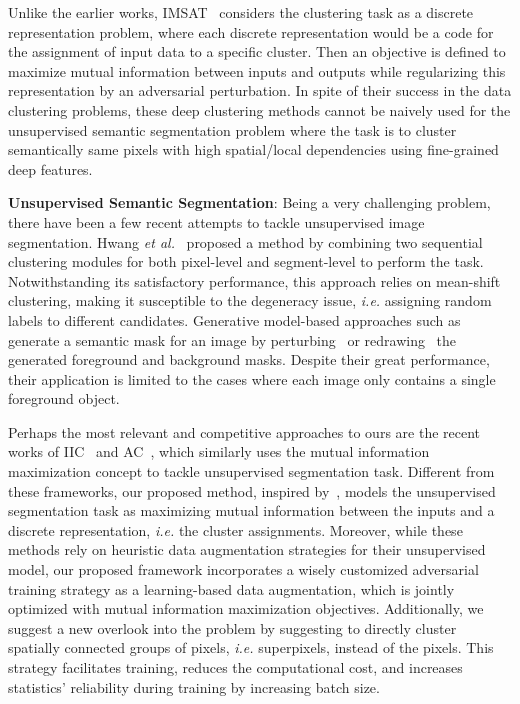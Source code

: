 \documentclass[letterpaper, 10 pt, journal, twoside]{IEEEtran}
\newcommand{\ie}{\emph{i.e.}\xspace}
\newcommand{\etal}{\emph{et al.}\xspace}
\begin{document}
Unlike the earlier works, IMSAT~\cite{IMSAT} considers the clustering task as a discrete representation problem, where each discrete representation would be a code for the assignment of input data to a specific cluster. Then an objective is defined to maximize mutual information between inputs and outputs while regularizing this representation by an adversarial perturbation. In spite of their success in the data clustering problems, these deep clustering methods cannot be naively used for the unsupervised semantic segmentation problem where the task is to cluster semantically same pixels with high spatial/local dependencies using fine-grained deep features.\par

\textbf{Unsupervised Semantic Segmentation}:
Being a very challenging problem, there have been a few recent attempts to tackle unsupervised image segmentation. 
Hwang \etal~\cite{SegSort} proposed a method by combining two sequential clustering modules for both pixel-level and segment-level to perform the task. Notwithstanding its satisfactory performance, this approach relies on mean-shift clustering, making it susceptible to the degeneracy issue, \ie assigning random labels to different candidates. 
Generative model-based approaches such as~\cite{ARL4, ReDrawGAN} generate a semantic mask for an image by perturbing~\cite{ARL4} or redrawing~\cite{ReDrawGAN} the generated foreground and background masks. Despite their great performance, their application is limited to the cases where each image only contains a single foreground object.\par
Perhaps the most relevant and competitive approaches to ours are the recent works of IIC~\cite{IIC} and AC~\cite{ARL}, which similarly uses the mutual information maximization concept to tackle unsupervised segmentation task. Different from these frameworks, our proposed method, inspired by~\cite{IMSAT}, models the unsupervised segmentation task as maximizing mutual information between the inputs and a discrete representation, \ie the cluster assignments.   
Moreover, while these methods rely on heuristic data augmentation strategies for their unsupervised model, our proposed framework incorporates a wisely customized adversarial training strategy as a learning-based data augmentation, which is jointly optimized with mutual information maximization objectives. Additionally, we suggest a new overlook into the problem by suggesting to directly cluster spatially connected groups of pixels, \ie superpixels, instead of the pixels. This strategy facilitates training, reduces the computational cost, and increases statistics' reliability during training by increasing batch size.
\end{document}
